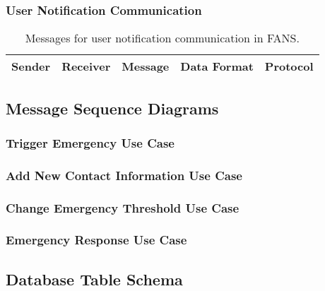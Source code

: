 \subsubsection{User Notification Communication}

\begin{table}[H]
    \centering
    \begin{tabular}{| c | c | c | c | c |}
        \hline
        Sender & Receiver & Message & Data Format & Protocol \\
        \hline
    \end{tabular}
    \caption{Messages for user notification communication in FANS.}
\end{table}

\subsection{Message Sequence Diagrams}

\subsubsection{Trigger Emergency Use Case}

\subsubsection{Add New Contact Information Use Case}

\subsubsection{Change Emergency Threshold Use Case}

\subsubsection{Emergency Response Use Case}

\subsection{Database Table Schema}
